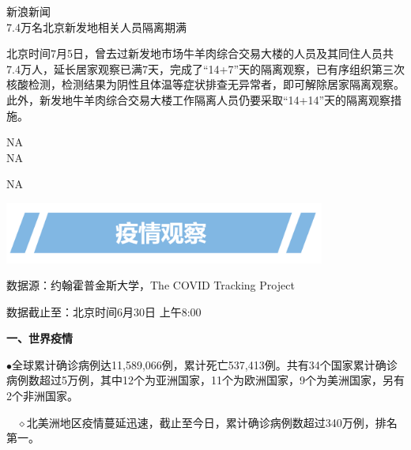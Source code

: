\documentclass[
]{article}
\begin{document}
\vspace{-3mm}

\begin{center}
\textcolor{glaucous}{新浪新闻}\\7.4万名北京新发地相关人员隔离期满
\end{center}

北京时间7月5日，曾去过新发地市场牛羊肉综合交易大楼的人员及其同住人员共7.4万人，延长居家观察已满7天，完成了``14+7''天的隔离观察，已有序组织第三次核酸检测，检测结果为阴性且体温等症状排查无异常者，即可解除居家隔离观察。此外，新发地牛羊肉综合交易大楼工作隔离人员仍要采取``14+14''天的隔离观察措施。

\begin{center}
\textcolor{glaucous}{NA}\\NA
\end{center}

NA

\vspace{10mm}

\begin{center}
\includegraphics[height=2cm]{./input/title2.png} 
\end{center}

\begin{Large}
\vspace{-7mm}
{数据源：约翰霍普金斯大学，The COVID Tracking  Project}
\end{Large}

\vspace{-7mm}

\begin{Large}
{数据截止至：北京时间6月30日 上午8:00}
\end{Large}

\begin{huge}{\textcolor{glaucous}{\textbf {一、世界疫情}}}\end{huge}

\vspace{-5mm}

\(\bullet\)全球累计确诊病例达11,589,066例，累计死亡537,413例。共有34个国家累计确诊病例数超过5万例，其中12个为亚洲国家，11个为欧洲国家，9个为美洲国家，另有2个非洲国家。

\(\quad\)\(\diamond\)北美洲地区疫情蔓延迅速，截止至今日，累计确诊病例数超过340万例，排名第一。
\end{document}
